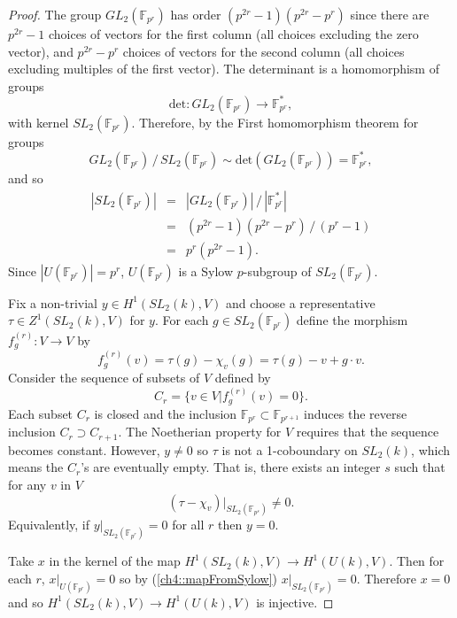 \begin{proof}
	The group $GL_2(\mathbb{F}_{p^r})$ has order $(p^{2r} - 1)(p^{2r} - p^r)$ since there are $p^{2r} - 1$ choices of vectors for the first column (all choices excluding the zero vector), and $p^{2r} - p^r$ choices of vectors for the second column (all choices excluding multiples of the first vector). The determinant is a homomorphism of groups
	\begin{displaymath}
		\mathrm{det}:GL_2(\mathbb{F}_{p^r}) \rightarrow \mathbb{F}^*_{p^r},
	\end{displaymath}
	with kernel $SL_2(\mathbb{F}_{p^r})$. Therefore, by the First homomorphism theorem for groups
	\begin{displaymath}
		GL_2(\mathbb{F}_{p^r})\,/\,SL_2(\mathbb{F}_{p^r}) \sim \mathrm{det}(GL_2(\mathbb{F}_{p^r})) = \mathbb{F}^*_{p^r},
	\end{displaymath}
	and so
	\begin{eqnarray*}
		|SL_2(\mathbb{F}_{p^r})|
		&=& |GL_2(\mathbb{F}_{p^r})|\,/\,|\mathbb{F}^*_{p^r}|\\
		&=& (p^{2r} - 1)(p^{2r} - p^r)\,/\,(p^r - 1)\\
		&=& p^r(p^{2r} - 1).
	\end{eqnarray*}
	Since $|U(\mathbb{F}_{p^r})| = p^r$, $U(\mathbb{F}_{p^r})$ is a Sylow $p$-subgroup of $SL_2(\mathbb{F}_{p^r})$.
	
	Fix a non-trivial $y\in H^1(SL_2(k), V)$ and choose a representative $\tau\in Z^1(SL_2(k), V)$ for $y$. For each $g\in SL_2(\mathbb{F}_{p^r})$ define the morphism $f^{(r)}_g:V\rightarrow V$ by
	\begin{displaymath}
		f^{(r)}_g(v) = \tau(g) - \chi_v(g) = \tau(g) - v + g\cdot v.
	\end{displaymath}
	Consider the sequence of subsets of $V$ defined by
	\begin{displaymath}
		C_r = \{v \in V | f^{(r)}_g(v) = 0\}.
	\end{displaymath}
	Each subset $C_r$ is closed and the inclusion $\mathbb{F}_{p^r} \subset \mathbb{F}_{p^{r+1}}$ induces the reverse inclusion $C_r \supset C_{r+1}$. The Noetherian property for $V$ requires that the sequence becomes constant. However, $y\neq 0$ so $\tau$ is not a 1-coboundary on $SL_2(k)$, which means the $C_r$'s are eventually empty. That is, there exists an integer $s$ such that for any $v$ in $V$
	\begin{displaymath}
		(\tau - \chi_v)|_{SL_2(\mathbb{F}_{p^s})} \neq 0.
	\end{displaymath}
	Equivalently, if $y|_{SL_2(\mathbb{F}_{p^r})} = 0$ for all $r$ then $y = 0$.
	
	Take $x$ in the kernel of the map $H^1(SL_2(k), V) \rightarrow H^1(U(k), V)$. Then for each $r$, $x|_{U(\mathbb{F}_{p^r})} = 0$ so by (\ref{ch4::mapFromSylow}) $x|_{SL_2(\mathbb{F}_{p^r})} = 0$. Therefore $x=0$ and so $H^1(SL_2(k), V) \rightarrow H^1(U(k), V)$ is injective.
\end{proof}

